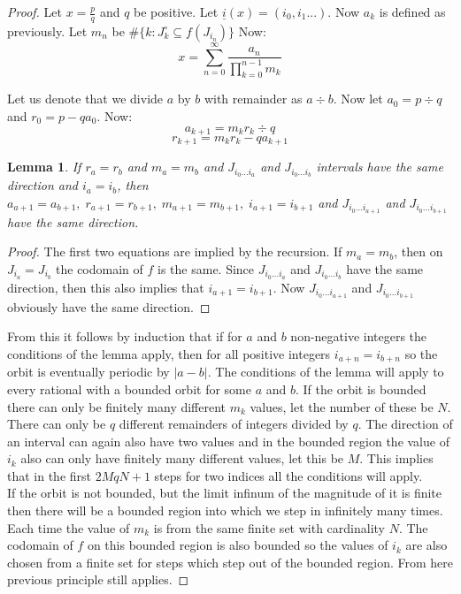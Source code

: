 \documentclass{article}
\newtheorem{lemma}[theorem]{Lemma}
\begin{document}
\begin{proof}
Let $x = \frac{p}{q}$ and $q$ be positive. Let $\underline{i}(x)=(i_0,i_1...)$. Now $a_k$ is defined as previously. Let $m_n$ be $\#\{k: J_k^\circ \subseteq f(J_{i_n})\}$ Now: \[
x=\sum_{n=0}^{\infty} \frac{a_n}{\prod_{k=0}^{n-1}m_k}
\]

Let us denote that we divide $a$ by $b$ with remainder as $a \div b$. Now let $a_0 = p \div q$ and $r_0 = p - qa_0$. Now: \[
a_{k+1} = m_k r_k \div q
\]\[
r_{k+1} = m_k r_k - q a_{k+1}
\]

\begin{lemma}
If $r_a = r_b$ and $m_a = m_b$ and $J_{i_0...i_a}$ and $J_{i_0...i_b}$ intervals have the same direction and $i_a = i_b$, then $a_{a+1}=a_{b+1},\; r_{a+1}=r_{b+1},\; m_{a+1}=m_{b+1}, \; i_{a+1}=i_{b+1}$ and $J_{i_0...i_{a+1}}$ and $J_{i_0...i_{b+1}}$ have the same direction.
\end{lemma}

\begin{proof}
The first two equations are implied by the recursion. If $m_a = m_b$, then on $J_{i_a} = J_{i_b}$ the codomain of $f$ is the same. Since $J_{i_0...i_{a}}$ and $J_{i_0...i_{b}}$ have the same direction, then this also implies that $i_{a+1}=i_{b+1}$. Now $J_{i_0...i_{a+1}}$ and $J_{i_0...i_{b+1}}$ obviously have the same direction.
\end{proof}

From this it follows by induction that if for $a$ and $b$ non-negative integers the conditions of the lemma apply, then for all positive integers $i_{a+n} = i_{b+n}$ so the orbit is eventually periodic by $|a-b|$. The conditions of the lemma will apply to every rational with a bounded orbit for some $a$ and $b$. If the orbit is bounded there can only be finitely many different $m_k$ values, let the number of these be $N$. There can only be $q$ different remainders of integers divided by $q$. The direction of an interval can again also have two values and in the bounded region the value of $i_k$ also can only have finitely many different values, let this be $M$. This implies that in the first $2MqN+1$ steps for two indices all the conditions will apply.\\

If the orbit is not bounded, but the limit infinum of the magnitude of it is finite then there will be a bounded region into which we step in infinitely many times. Each time the value of $m_k$ is from the same finite set with cardinality $N$. The codomain of $f$ on this bounded region is also bounded so the values of $i_k$ are also chosen from a finite set for steps which step out of the bounded region. From here previous principle still applies.
\end{proof}
\end{document}
